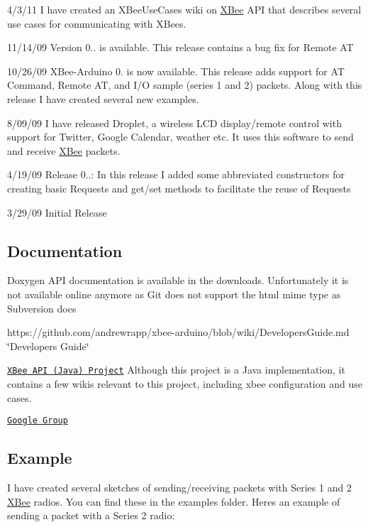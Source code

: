 \begin{DoxyItemize}
\item 4/3/11 I have created an X\+Bee\+Use\+Cases wiki on \hyperlink{class_x_bee}{X\+Bee} A\+PI that describes several use cases for communicating with X\+Bees.
\item 11/14/09 Version 0.. is available. This release contains a bug fix for Remote AT
\item 10/26/09 X\+Bee-\/\+Arduino 0. is now available. This release adds support for AT Command, Remote AT, and I/O sample (series 1 and 2) packets. Along with this release I have created several new examples.
\item 8/09/09 I have released Droplet, a wireless L\+CD display/remote control with support for Twitter, Google Calendar, weather etc. It uses this software to send and receive \hyperlink{class_x_bee}{X\+Bee} packets.
\item 4/19/09 Release 0..\+: In this release I added some abbreviated constructors for creating basic Requests and get/set methods to facilitate the reuse of Requests
\item 3/29/09 Initial Release
\end{DoxyItemize}

\subsection*{Documentation}

Doxygen A\+PI documentation is available in the downloads. Unfortunately it is not available online anymore as Git does not support the html mime type as Subversion does

https\+://github.com/andrewrapp/xbee-\/arduino/blob/wiki/\+Developers\+Guide.\+md \char`\"{}\+Developer\textquotesingle{}s Guide\char`\"{}

\href{https://github.com/andrewrapp/xbee-api}{\tt X\+Bee A\+PI (Java) Project} Although this project is a Java implementation, it contains a few wikis relevant to this project, including xbee configuration and use cases.

\href{https://groups.google.com/forum/#!forum/xbee-api}{\tt Google Group}

\subsection*{Example}

I have created several sketches of sending/receiving packets with Series 1 and 2 \hyperlink{class_x_bee}{X\+Bee} radios. You can find these in the examples folder. Here\textquotesingle{}s an example of sending a packet with a Series 2 radio\+:


